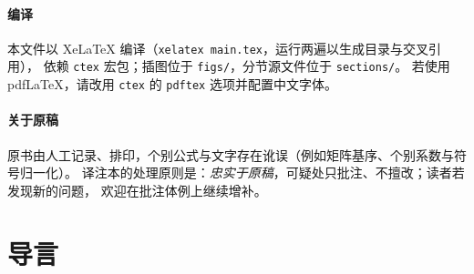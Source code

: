 \documentclass[11pt,a4paper]{article}
\theoremstyle{remark}
\theoremstyle{definition}
\theoremstyle{plain}
\begin{document}


\paragraph{编译}
本文件以 XeLaTeX 编译（\texttt{xelatex main.tex}，运行两遍以生成目录与交叉引用），
依赖 \texttt{ctex} 宏包；插图位于 \texttt{figs/}，分节源文件位于 \texttt{sections/}。
若使用 pdfLaTeX，请改用 \texttt{ctex} 的 \texttt{pdftex} 选项并配置中文字体。

\paragraph{关于原稿}
原书由人工记录、排印，个别公式与文字存在讹误（例如矩阵基序、个别系数与符号归一化）。
译注本的处理原则是：\emph{忠实于原稿}，可疑处只批注、不擅改；读者若发现新的问题，
欢迎在批注体例上继续增补。

\clearpage
\tableofcontents
\clearpage

\section*{导言}


\clearpage




\clearpage



\clearpage



\clearpage



\clearpage



\clearpage


\clearpage



\clearpage



\end{document}
